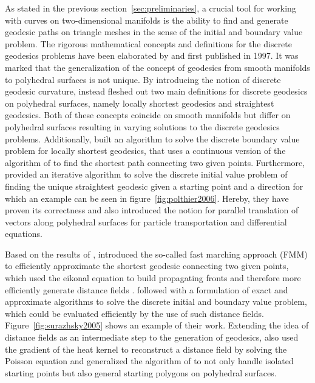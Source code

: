 \documentclass{stdlocal}
\begin{document}
As stated in the previous section~\ref{sec:preliminaries}, a crucial tool for working with curves on two-dimensional manifolds is the ability to find and generate geodesic paths on triangle meshes in the sense of the initial and boundary value problem.
The rigorous mathematical concepts and definitions for the discrete geodesics problems have been elaborated by \textcite{mitchell1987} and \textcite{polthier2006} first published in 1997.
It was marked that the generalization of the concept of geodesics from smooth manifolds to polyhedral surfaces is not unique.
By introducing the notion of discrete geodesic curvature, \textcite{polthier2006} instead fleshed out two main definitions for discrete geodesics on polyhedral surfaces, namely locally shortest geodesics and straightest geodesics.
Both of these concepts coincide on smooth manifolds but differ on polyhedral surfaces resulting in varying solutions to the discrete geodesics problems.
Additionally, \textcite{mitchell1987} built an algorithm to solve the discrete boundary value problem for locally shortest geodesics, that uses a continuous version of the algorithm of \textcite{dijkstra1959} to find the shortest path connecting two given points.
Furthermore, \textcite{polthier2006} provided an iterative algorithm to solve the discrete initial value problem of finding the unique straightest geodesic given a starting point and a direction for which an example can be seen in figure~\ref{fig:polthier2006}.
Hereby, they have proven its correctness and also introduced the notion for parallel translation of vectors along polyhedral surfaces for particle transportation and differential equations.

Based on the results of \textcite{mitchell1987}, \citeauthor{kimmel1998} introduced the so-called fast marching approach (FMM) to efficiently approximate the shortest geodesic connecting two given points, which used the eikonal equation to build propagating fronts and therefore more efficiently generate distance fields \autocite{sethian1996,kimmel1996,kimmel1998}.
\textcite{surazhsky2005} followed with a formulation of exact and approximate algorithms to solve the discrete initial and boundary value problem, which could be evaluated efficiently by the use of such distance fields.
Figure~\ref{fig:surazhsky2005} shows an example of their work.
Extending the idea of distance fields as an intermediate step to the generation of geodesics, \textcite{crane2013} also used the gradient of the heat kernel to reconstruct a distance field by solving the Poisson equation and \textcite{bommes2007} generalized the algorithm of \textcite{surazhsky2005} to not only handle isolated starting points but also general starting polygons on polyhedral surfaces.
\end{document}
